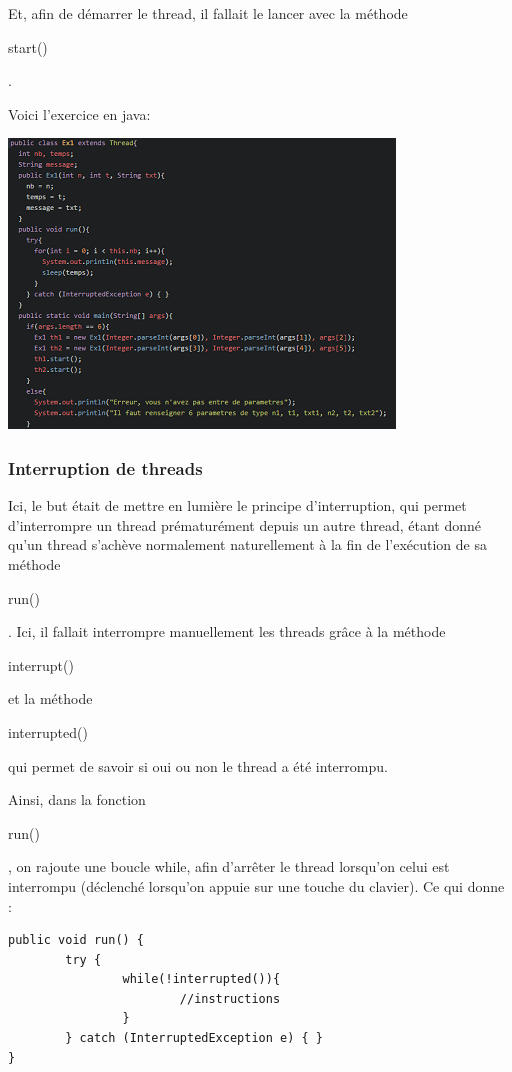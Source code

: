 \documentclass{article}
\begin{document}
Et, afin de démarrer le thread, il fallait le lancer avec la méthode \begin{it}start()\end{it}.

Voici l'exercice en java:
\begin{center}
\includegraphics{ex1_1.png}
\end{center}

\subsubsection{Interruption de threads}
\label{section : interruptionthread}

Ici, le but était de mettre en lumière le principe d'interruption, qui permet d'interrompre un thread prématurément depuis un autre thread, étant donné qu'un thread s'achève normalement naturellement à la fin de l'exécution de sa méthode \begin{it}run()\end{it}.
Ici, il fallait interrompre manuellement les threads grâce à la méthode \begin{it}interrupt()\end{it} et la méthode \begin{it}interrupted()\end{it} qui permet de savoir si oui ou non le thread a été interrompu.

Ainsi, dans la fonction \begin{it}run()\end{it}, on rajoute une boucle while, afin d'arrêter le thread lorsqu'on celui est interrompu (déclenché lorsqu'on appuie sur une touche du clavier). Ce qui donne :
\begin{verbatim}
public void run() {
		try {
				while(!interrupted()){
						//instructions
				}
		} catch (InterruptedException e) { }
}
\end{verbatim} 
\end{document}
